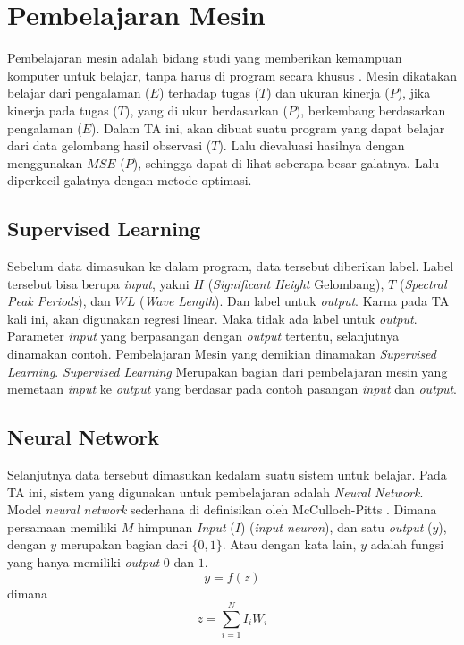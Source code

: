 \section{Pembelajaran Mesin}
    Pembelajaran mesin adalah bidang studi yang memberikan kemampuan komputer untuk belajar, tanpa harus di program secara khusus \cite{arthur_l_samuel_1959}. Mesin dikatakan belajar dari pengalaman ($E$) terhadap tugas ($T$) dan ukuran kinerja ($P$), jika kinerja pada tugas ($T$), yang di ukur berdasarkan ($P$), berkembang berdasarkan pengalaman ($E$). Dalam TA ini, akan dibuat suatu program yang dapat belajar dari data gelombang hasil observasi ($T$). Lalu dievaluasi hasilnya dengan menggunakan $MSE$ ($P$), sehingga dapat di lihat seberapa besar galatnya. Lalu diperkecil galatnya dengan metode optimasi.

\subsection{Supervised Learning}
    Sebelum data dimasukan ke dalam program, data tersebut diberikan label. Label tersebut bisa berupa \emph{input}, yakni $H$ (\emph{Significant Height} Gelombang), $T$ (\emph{Spectral Peak Periods}), dan $WL$ (\emph{Wave Length}). Dan label untuk \emph{output}. Karna pada TA kali ini, akan digunakan regresi linear. Maka tidak ada label untuk \emph{output}. Parameter \emph{input} yang berpasangan dengan \emph{output} tertentu, selanjutnya dinamakan contoh. Pembelajaran Mesin yang demikian dinamakan \emph{Supervised Learning}. \emph{Supervised Learning} Merupakan bagian dari pembelajaran mesin yang memetaan \emph{input} ke \emph{output} yang berdasar pada contoh pasangan \emph{input} dan \emph{output}\cite{AIPeterNorvig}. 

\subsection{Neural Network}
    Selanjutnya data tersebut dimasukan kedalam suatu sistem untuk belajar. Pada TA ini, sistem yang digunakan untuk pembelajaran adalah \emph{Neural Network}.
    Model \emph{neural network} sederhana di definisikan oleh McCulloch-Pitts \cite{McCulloch1943}. Dimana persamaan memiliki $M$ himpunan \emph{Input} ($I$) (\emph{input neuron}), dan satu \emph{output} ($y$), dengan $y$ merupakan bagian dari $\{0,1\}$. Atau dengan kata lain, $y$ adalah fungsi yang hanya memiliki \emph{output} $0$ dan $1$.
    \begin{equation}
        y = f(z)
    \end{equation}
    dimana
    \begin{equation}
    \label{eq:mcullochNeuralNetwork}
        z = \sum_{i=1}^N I_iW_i
    \end{equation}

